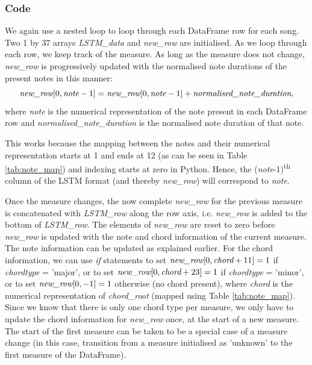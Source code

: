 \subsubsection{Code}
We again use a nested loop to loop through each DataFrame row for each song. Two 1 by 37 arrays \emph{LSTM\_data} and \emph{new\_row} are initialised. As we loop through each row, we keep track of the measure. As long as the measure does not change, \emph{new\_row} is progressively updated with the normalised note durations of the present notes in this manner: 
\begin{equation}  
\emph{new\_row}[0,\emph{note}-1] = \emph{new\_row}[0,\emph{note}-1] + \emph{normalised\_note\_duration},
\end{equation}
where \emph{note} is the numerical representation of the note present in each DataFrame row and \emph{normalised\_note\_duration} is the normalised note duration of that note. 

This works because the mapping between the notes and their numerical representation starts at 1 and ends at 12 (as can be seen in Table \ref{tab:note_map}) and indexing starts at zero in Python. Hence, the (\emph{note}-1)\textsuperscript{th} column of the LSTM format (and thereby \emph{new\_row}) will correspond to \emph{note}.

Once the measure changes, the now complete \emph{new\_row} for the previous measure is concatenated with \emph{LSTM\_row} along the row axis, i.e. \emph{new\_row} is added to the bottom of \emph{LSTM\_row}. The elements of \emph{new\_row} are reset to zero before \emph{new\_row} is updated with the note and chord information of the current measure. The note information can be updated as explained earlier. For the chord information, we can use \emph{if} statements to set $\emph{new\_row}[0, \emph{chord}+11] = 1$ if \emph{chordtype} = 'major', or to set $\emph{new\_row}[0, \emph{chord}+23] = 1$ if \emph{chordtype} = 'minor', or to set $\emph{new\_row}[0, -1] = 1$ otherwise (no chord present), where \emph{chord} is the numerical representation of \emph{chord\_root} (mapped using Table \ref{tab:note_map}). Since we know that there is only one chord type per measure, we only have to update the chord information for \emph{new\_row} once, at the start of a new measure. The start of the first measure can be taken to be a special case of a measure change (in this case, transition from a measure initialised as 'unknown' to the first measure of the DataFrame).

